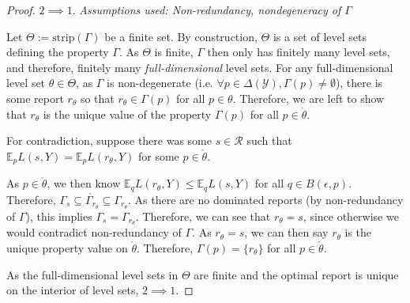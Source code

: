 \documentclass[12pt]{article}
\newcommand{\E}{\mathbb{E}}
\newcommand{\R}{\mathcal{R}}
\newcommand{\Y}{\mathcal{Y}}
\newcommand{\inter}[1]{\mathring{#1}}%
\newcommand{\im}{\text{im}}
\newcommand{\strip}{\text{strip}}
\begin{document}
\begin{proof}





\bigskip
$2 \implies 1$.  
\emph{Assumptions used: Non-redundancy, nondegeneracy of $\Gamma$}

Let $\Theta := \strip(\Gamma)$ be a finite set.
By construction, $\Theta$ is a set of level sets defining the property $\Gamma$.
As $\Theta$ is finite, $\Gamma$ then only has finitely many level sets, and therefore, finitely many \emph{full-dimensional} level sets.
For any full-dimensional level set $\theta \in \Theta$, as $\Gamma$ is non-degenerate (i.e. $\forall p \in \Delta(\Y), \Gamma(p) \neq \emptyset$), there is some report $r_\theta$ so that $r_\theta \in \Gamma(p)$ for all $p \in \theta$.
Therefore, we are left to show that $r_\theta$ is the unique value of the property $\Gamma(p)$ for all $p \in \inter{\theta}$.

For contradiction, suppose there was some $s \in \R$ such that $\E_p L(s,Y) = \E_p L(r_\theta, Y)$ for some $p \in \inter{\theta}$.

As $p \in \inter{\theta}$, we then know $\E_q L(r_\theta, Y) \leq \E_q L(s,Y)$ for all $q \in B(\epsilon, p)$.
Therefore, $\Gamma_s \subseteq \inter{\Gamma_{r_\theta}} \subseteq \Gamma_{r_\theta}$.
As there are no dominated reports (by non-redundancy of $\Gamma$), this implies $\Gamma_s = \Gamma_{r_\theta}$.
Therefore, we can see that $r_\theta = s$, since otherwise we would contradict non-redundancy of $\Gamma$.
As $r_\theta = s$, we can then say $r_\theta$ is the unique property value on $\inter{\theta}$.
Therefore, $\Gamma(p) = \{r_\theta\}$ for all $p \in \inter{\theta}$.

As the full-dimensional level sets in $\Theta$ are finite and the optimal report is unique on the interior of level sets, $2 \implies 1$.

\end{proof}
\end{document}
